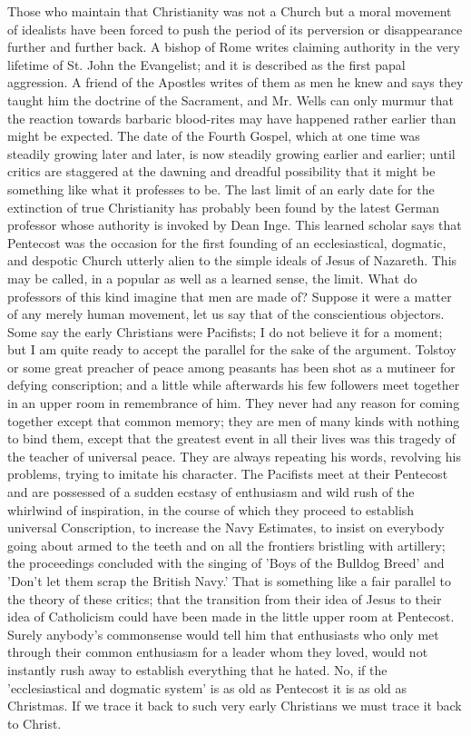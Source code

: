 Those who maintain that Christianity was not a Church but a moral movement of idealists have been forced to push the period of its perversion or disappearance further and further back. A bishop of Rome writes claiming authority in the very lifetime of St. John the Evangelist; and it is described as the first papal aggression. A friend of the Apostles writes of them as men he knew and says they taught him the doctrine of the Sacrament, and Mr. Wells can only murmur that the reaction towards barbaric blood-rites may have happened rather earlier than might be expected. The date of the Fourth Gospel, which at one time was steadily growing later and later, is now steadily growing earlier and earlier; until critics are staggered at the dawning and dreadful possibility that it might be something like what it professes to be. The last limit of an early date for the extinction of true Christianity has probably been found by the latest German professor whose authority is invoked by Dean Inge. This learned scholar says that Pentecost was the occasion for the first founding of an ecclesiastical, dogmatic, and despotic Church utterly alien to the simple ideals of Jesus of Nazareth. This may be called, in a popular as well as a learned sense, the limit. What do professors of this kind imagine that men are made of? Suppose it were a matter of any merely human movement, let us say that of the conscientious objectors. Some say the early Christians were Pacifists; I do not believe it for a moment; but I am quite ready to accept the parallel for the sake of the argument. Tolstoy or some great preacher of peace among peasants has been shot as a mutineer for defying conscription; and a little while afterwards his few followers meet together in an upper room in remembrance of him. They never had any reason for coming together except that common memory; they are men of many kinds with nothing to bind them, except that the greatest event in all their lives was this tragedy of the teacher of universal peace. They are always repeating his words, revolving his problems, trying to imitate his character. The Pacifists meet at their Pentecost and are possessed of a sudden ecstasy of enthusiasm and wild rush of the whirlwind of inspiration, in the course of which they proceed to establish universal Conscription, to increase the Navy Estimates, to insist on everybody going about armed to the teeth and on all the frontiers bristling with artillery; the proceedings concluded with the singing of 'Boys of the Bulldog Breed' and 'Don't let them scrap the British Navy.' That is something like a fair parallel to the theory of these critics; that the transition from their idea of Jesus to their idea of Catholicism could have been made in the little upper room at Pentecost. Surely anybody's commonsense would tell him that enthusiasts who only met through their common enthusiasm for a leader whom they loved, would not instantly rush away to establish everything that he hated. No, if the 'ecclesiastical and dogmatic system' is as old as Pentecost it is as old as Christmas. If we trace it back to such very early Christians we must trace it back to Christ.

